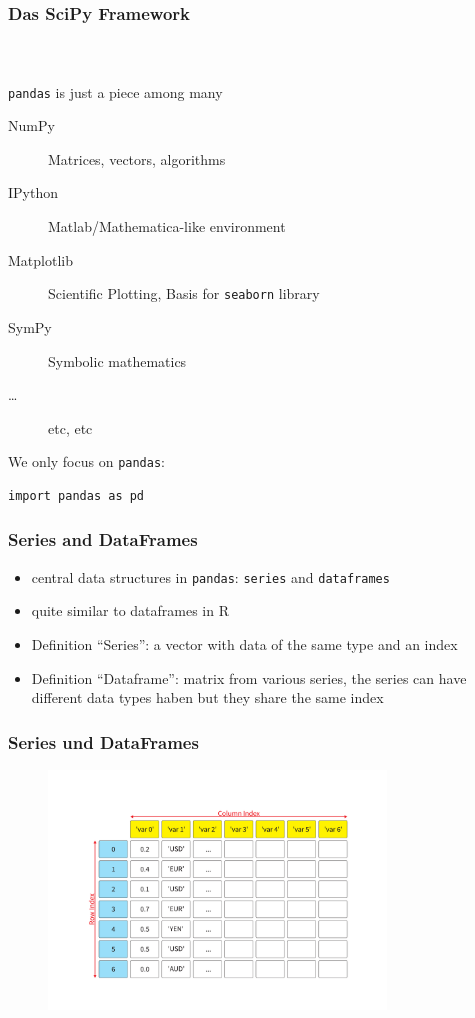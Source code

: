 \documentclass[ngerman]{beamer}
\begin{document}
\begin{frame}[containsverbatim]
\frametitle{Das SciPy Framework}
\framesubtitle{~}

\texttt{pandas} is just a piece among many

\begin{description}
\item[NumPy] Matrices, vectors, algorithms
\item[IPython] Matlab/Mathematica-like environment
\item[Matplotlib] Scientific Plotting, Basis for \texttt{seaborn} library
\item[SymPy] Symbolic mathematics
\item [\ldots] etc, etc
\end{description}\vspace*{0.5em}

We only focus on \texttt{pandas}:

\begin{lstlisting}
import pandas as pd
\end{lstlisting}

\end{frame}

\begin{frame}
\frametitle{Series and DataFrames}

\begin{itemize}
\item central data structures in  \texttt{pandas}: \texttt{series} and \texttt{dataframes}
\item quite similar to dataframes in R
\item Definition \enquote{Series}: a vector with data of the same type and an index
\item Definition \enquote{Dataframe}: matrix from various series, the series can have different data types haben but they share the same index
\end{itemize}
\end{frame}

\begin{frame}
\frametitle{Series und DataFrames}

\begin{figure}
\begin{center}
\includegraphics[trim=50mm 55mm 45mm 55mm,width=0.8\textwidth]{Pictures/SeriesFrames.pdf}
\end{center}
\end{figure}

\end{frame}
\end{document}
